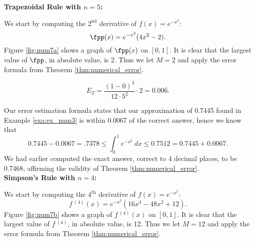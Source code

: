 \begin{solution}
{
\noindent \textbf{Trapezoidal Rule with $n=5$:}


We start by computing the $2^\text{nd}$ derivative of $f(x) = e^{-x^2}$: $$\fpp(x) = e^{-x^2}(4x^2-2).$$ Figure \ref{fig:num7a} shows a graph of $\fpp(x)$ on $[0,1]$. It is clear that the largest value of $\fpp$, in absolute value, is 2. Thus we let $M=2$ and apply the error formula from Theorem \ref{thm:numerical_error}.

$$E_T = \frac{(1-0)^3}{12\cdot 5^2}\cdot 2 = 0.00\overline{6}.$$

Our error estimation formula states that our approximation of 0.7445 found in Example \ref{exa:ex_num3} is within $ 0.0067 $ of the correct answer, hence we know that
$$0.7445-0.0067 = .7378 \leq \int_0^1e^{-x^2}\ dx \leq 0.7512 = 0.7445 + 0.0067.$$ We had earlier computed the exact answer, correct to 4 decimal places, to be 0.7468, affirming the validity of Theorem \ref{thm:numerical_error}.\\

\noindent\textbf{Simpson's Rule with $n=4$:}


We start by computing the $4^\text{th}$ derivative of $f(x) = e^{-x^2}$: $$f\,^{(4)}(x) = e^{-x^2}(16x^4-48x^2+12).$$ Figure \ref{fig:num7b} shows a graph of $f\,^{(4)}(x)$ on $[0,1]$. It is clear that the largest value of $f\,^{(4)}$, in absolute value, is 12. Thus we let $M=12$ and apply the error formula from Theorem \ref{thm:numerical_error}.

}
\end{solution}
